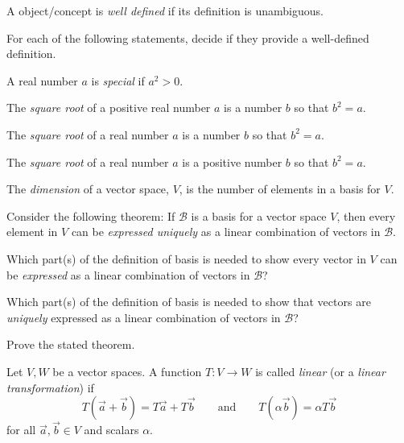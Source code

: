 \documentclass[14pt]{problemset}
\begin{document}
	\begin{definition}
		A object/concept is \emph{well defined} if its definition is unambiguous.
	\end{definition}

	\question
	For each of the following statements, decide if they provide a well-defined definition.
	\begin{parts}
		\item A real number $a$ is \emph{special} if $a^2>0$.
		\item The \emph{square root} of a positive real number $a$ is a number $b$ so
			that $b^2=a$.
		\item The \emph{square root} of a real number $a$ is a number $b$ so
			that $b^2=a$.
		\item The \emph{square root} of a real number $a$ is a positive number $b$ so
			that $b^2=a$.
		\item The \emph{dimension} of a vector space, $V$, is the number of elements in a basis
			for $V$.
	\end{parts}

	\question
	Consider the following theorem: If $\mathcal B$ is a basis for a vector space $V$, then every
	element in $V$ can be \emph{expressed uniquely} as a linear combination of vectors in $\mathcal B$.
	\begin{parts}
		\item Which part(s) of the definition of basis is needed to show every vector in $V$ can be
			\emph{expressed} as a linear combination of vectors in $\mathcal B$?
		\item Which part(s) of the definition of basis is needed to show that vectors 
			are \emph{uniquely} expressed as a linear 
			combination of vectors in $\mathcal B$?
		\item Prove the stated theorem.
	\end{parts}

	\newpage
	\begin{definition}
		Let $V,W$ be a vector spaces. A function $T:V\to W$ is called
		\emph{linear} (or a \emph{linear transformation}) if
		\[
			T(\vec a+\vec b)=T\vec a+T\vec b\qquad\text{and}\qquad
			T(\alpha\vec b)=\alpha T\vec b
		\]
		for all $\vec a,\vec b\in V$ and scalars $\alpha$.
	\end{definition}
\end{document}
